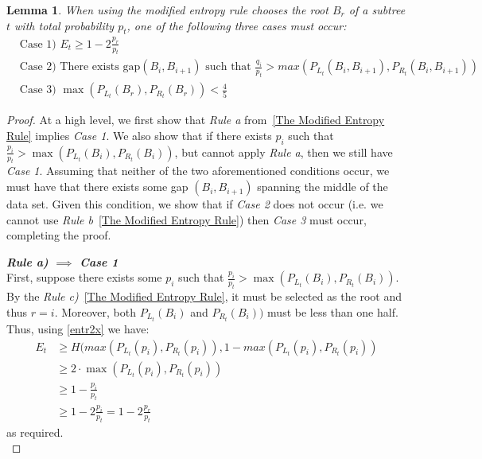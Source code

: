 \documentclass[letterpaper,12pt,titlepage,oneside,final]{book}
\theoremstyle{plain}
\newtheorem{lem}[thm]{Lemma}
\begin{document}
\begin{lem}\label{MECases}
When using the modified entropy rule chooses the root $B_r$ of a subtree $t$ with total probability $p_t$, one of the following three cases must occur: 
\begin{align*}
&\text{Case 1) } E_t \geq 1-2 \frac{p_r}{p_t} \\
&\text{Case 2) There exists gap}  (B_i, B_{i+1}) \text{ such that } \frac{q_i}{p_t} > max(P_{L_t}(B_i, B_{i+1}), P_{R_t}(B_i, B_{i+1}))\\
&\text{Case 3) }  \max(P_{L_t}(B_r), P_{R_t}(B_r)) < \frac{4}{5}
\end{align*}

\end{lem}
\begin{proof} At a high level, we first show that \textit{Rule a} from~\ref{The Modified Entropy Rule} implies \textit{Case 1}. We also show that if there exists $p_i$ such that $\frac{p_i}{p_t} > \max(P_{L_t}(B_i), P_{R_t}(B_i))$, but cannot apply \textit{Rule a}, then we still have \textit{Case 1}. Assuming that neither of the two aforementioned conditions occur, we must have that there exists some gap $(B_i, B_{i+1})$ spanning the middle of the data set. Given this condition, we show that if \textit{Case 2} does not occur (i.e. we cannot use \textit{Rule b}~\ref{The Modified Entropy Rule}) then \textit{Case 3} must occur, completing the proof. 


\noindent\textbf{\textit{Rule a) $\implies$ Case 1}} \\
 First, suppose there exists some $p_i$ such that $\frac{p_i}{p_t} > \max(P_{L_t}(B_i), P_{R_t}(B_i))$. By the \textit{Rule c)}~\ref{The Modified Entropy Rule}, it must be selected as the root and thus $r=i$. Moreover, both $P_{L_t}(B_i)$ and $P_{R_t}(B_i))$ must be less than one half. Thus, using \ref{entr2x} we have: 
\begin{align*}
E_t &\geq H( max(P_{L_t}(p_i), P_{R_t}(p_i)), 1-max(P_{L_t}(p_i), P_{R_t}(p_i)) \\
 &\geq 2\cdot \max(P_{L_t}(p_i), P_{R_t}(p_i)) \\  &\geq 1-\frac{p_i}{p_t} \\ 
 &\geq 1-2 \frac{p_i}{p_t} = 1-2 \frac{p_r}{p_t} 
\end{align*}
 as required. \\
 

\end{proof}
\end{document}
